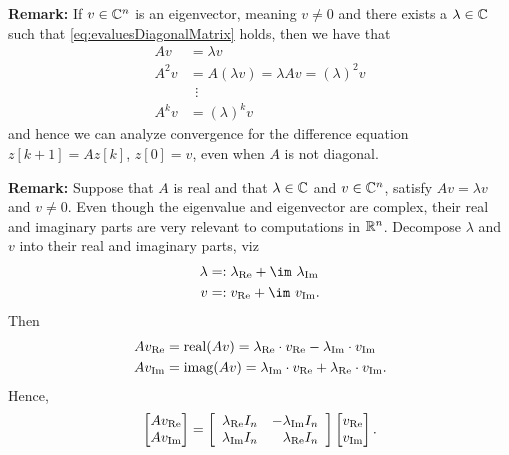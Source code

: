 \vspace*{0.2cm}
\textbf{Remark:} If $ v \in \mathbb C^n$ is an eigenvector, meaning $v \neq 0$ and there exists a $\lambda \in \mathbb C$
such that \eqref{eq:evaluesDiagonalMatrix} holds, then we have that
\begin{align*}
    A v & = \lambda v\\
    A^2 v & = A (\lambda v) = \lambda  A  v  = (\lambda)^2 v\\
    & ~~\vdots \\
    A^k v & = (\lambda)^k v
\end{align*}
and hence we can analyze convergence for the difference equation $z[k+1]=A z[k]$, $z[0]=v$, even when $A$ is not diagonal.
\vspace*{0.2cm}

\textbf{Remark:} Suppose that $A$ is real and that $\lambda \in \mathbb C$ and $ v \in \mathbb C^n$, satisfy $Av = \lambda v$ and $v\neq 0$. Even though the eigenvalue and eigenvector are complex, their real and imaginary parts are very relevant to computations in $\mathbb R^n$. Decompose $\lambda$ and $v$ into their real and imaginary parts, viz
\begin{equation}
    \label{eq:JordanSubspaceStuff}
    \begin{aligned}
    \lambda&=: \lambda_{\rm Re} + \im ~\lambda_{\rm Im}\\
    v&=: v_{\rm Re} + \im ~v_{\rm Im}.
    \end{aligned}
\end{equation}
Then
\begin{equation}
    \label{eq:JordanSubspaceStuff02}
    \begin{aligned}
   A v_{\rm Re} &= \mathrm{real} ( A v ) =\lambda_{\rm Re} \cdot v_{\rm Re} - \lambda_{\rm Im} \cdot v_{\rm Im}\\
    A v_{\rm Im} &= \mathrm{imag} ( A v ) =  \lambda_{\rm Im} \cdot v_{\rm Re} + \lambda_{\rm Re} \cdot v_{\rm Im}.
    \end{aligned}
\end{equation}
Hence, 
\begin{equation}
    \label{eq:JordanSubspaceStuff03}
     \begin{bmatrix}
      A v_{\rm Re}\\ A v_{\rm Im}
    \end{bmatrix} = \left[ \begin{array}{rr} \lambda_{\rm Re} I_n & - \lambda_{\rm Im} I_n\\
     \lambda_{\rm Im}I_n &  \lambda_{\rm Re} I_n\end{array} \right] \begin{bmatrix}
      v_{\rm Re}\\ v_{\rm Im}
    \end{bmatrix}. 
\end{equation}
